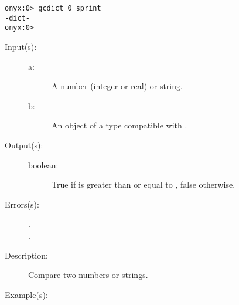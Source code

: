 \begin{description}
\begin{description}
\begin{verbatim}
onyx:0> gcdict 0 sprint
-dict-
onyx:0>
		\end{verbatim}
	\end{description}
\label{systemdict:ge}
\item[{\onyxop{a b}{ge}{boolean}}: ]
	\begin{description}\item[]
	\item[Input(s): ]
		\begin{description}\item[]
		\item[a: ]
			A number (integer or real) or string.
		\item[b: ]
			An object of a type compatible with .
		\end{description}
	\item[Output(s): ]
		\begin{description}\item[]
		\item[boolean: ]
			True if  is greater than or equal to ,
			false otherwise.
		\end{description}
	\item[Errors(s): ]
		\begin{description}\item[]
		\item[.]
		\item[.]
		\end{description}
	\item[Description: ]
		Compare two numbers or strings.
	\item[Example(s): ]\begin{verbatim}


\end{verbatim}
\end{description}
\end{description}
